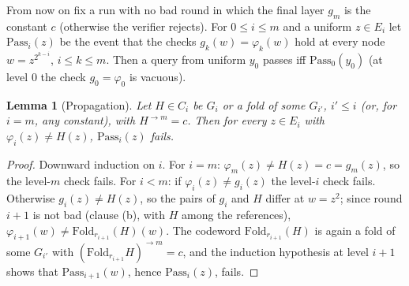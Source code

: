 \documentclass[11pt]{article}
\newtheorem{lemma}[theorem]{Lemma}
\theoremstyle{definition}
\newcommand{\Fold}{\mathrm{Fold}}
\begin{document}
From now on fix a run with no bad round in which the final layer $g_m$ is the constant $c$ (otherwise the verifier rejects). For $0\le i\le m$ and a uniform $z\in E_i$ let $\mathrm{Pass}_i(z)$ be the event that the checks $g_k(w)=\varphi_k(w)$ hold at every node $w=z^{2^{k-i}}$, $i\le k\le m$. Then a query from uniform $y_0$ passes iff $\mathrm{Pass}_0(y_0)$ (at level $0$ the check $g_0=\varphi_0$ is vacuous).

\begin{lemma}[Propagation]\label{lem:prop}
Let $H\in C_i$ be $G_i$ or a fold of some $G_{i'}$, $i'\le i$ (or, for $i=m$, any constant), with $H^{\to m}=c$. Then for every $z\in E_i$ with $\varphi_i(z)\ne H(z)$, $\mathrm{Pass}_i(z)$ fails.
\end{lemma}
\begin{proof}
Downward induction on $i$. For $i=m$: $\varphi_m(z)\ne H(z)=c=g_m(z)$, so the level-$m$ check fails. For $i<m$: if $\varphi_i(z)\ne g_i(z)$ the level-$i$ check fails. Otherwise $g_i(z)\ne H(z)$, so the pairs of $g_i$ and $H$ differ at $w=z^2$; since round $i+1$ is not bad (clause (b), with $H$ among the references), $\varphi_{i+1}(w)\ne\Fold_{r_{i+1}}(H)(w)$. The codeword $\Fold_{r_{i+1}}(H)$ is again a fold of some $G_{i'}$ with $(\Fold_{r_{i+1}}H)^{\to m}=c$, and the induction hypothesis at level $i+1$ shows that $\mathrm{Pass}_{i+1}(w)$, hence $\mathrm{Pass}_i(z)$, fails.
\end{proof}
\end{document}
